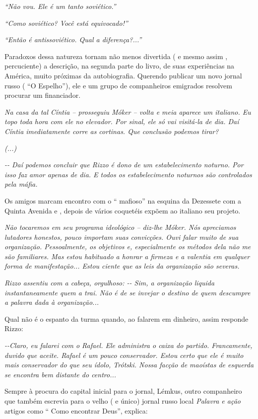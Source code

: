 \emph{``Não vou. Ele é um tanto soviético.''}

\emph{``Como soviético? Você está equivocado!''}

\emph{``Então é antissoviético. Qual a diferença?...''}

Paradoxos dessa natureza tornam não menos divertida ( e mesmo assim ,
percuciente) a descrição, na segunda parte do livro, de suas
experiências na América, muito próximas da autobiografia. Querendo
publicar um novo jornal russo ( ``O Espelho''), ele e um grupo de
companheiros emigrados resolvem procurar um financiador.

\emph{Na casa da tal Cíntia -- prosseguiu Móker -- volta e meia aparece
um italiano. Eu topo toda hora com ele no elevador. Por sinal, ele só
vai visitá-la de dia. Daí Cíntia imediatamente corre as cortinas. Que
conclusão podemos tirar?}

\emph{(...)}

\emph{-\/- Daí podemos concluir que Rizzo é dono de um estabelecimento
noturno. Por isso faz amor apenas de dia. E todos os estabelecimento
noturnos são controlados pela máfia.}

Os amigos marcam encontro com o `` mafioso'' na esquina da Dezessete com
a Quinta Avenida e , depois de vários coquetéis expõem ao italiano seu
projeto.

\emph{Não tocaremos em seu programa ideológico -- diz-lhe Móker. Nós
apreciamos lutadores honestos, pouco importam suas convicções. Ouvi
falar muito de sua organização. Pessoalmente, os objetivos e,
especialmente os métodos dela não me são familiares. Mas estou habituado
a honrar a firmeza e a valentia em qualquer forma de manifestação...
Estou ciente que as leis da organização são severas.}

\emph{Rizzo assentiu com a cabeça, orgulhoso: -\/- Sim, a organização
liquida instantaneamente quem a trai. Não é de se invejar o destino de
quem descumpre a palavra dada à organização...}

Qual não é o espanto da turma quando, ao falarem em dinheiro, assim
responde Rizzo:

\emph{-\/-Claro, eu falarei com o Rafael. Ele administra o caixa do
partido. Francamente, duvido que aceite. Rafael é um pouco conservador.
Estou certo que ele é muito mais conservador do que seu ídolo, Trótski.
Nossa facção de maoístas de esquerda se encontra bem distante do
centro...}

Sempre à procura do capital inicial para o jornal, Lémkus, outro
companheiro que também escrevia para o velho ( e único) jornal russo
local \emph{Palavra e ação} artigos como `` Como encontrar Deus'',
explica:

